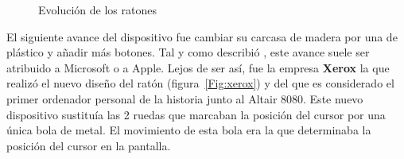 \begin{figure}[t]
     \hfill
{}
     \caption{Evoluci\'on de los ratones}
     \label{fig:primera}
   \end{figure}


El siguiente avance del dispositivo fue cambiar su carcasa de madera por una de pl\'astico y a\~nadir m\'as botones. Tal y como describi\'o \cite{xerox}, este avance suele ser atribuido a Microsoft o a Apple. Lejos de ser as\'i, fue la empresa \textbf{Xerox} la que realiz\'o el nuevo dise\~no del rat\'on (figura~\ref{Fig:xerox}) y del que es considerado el primer ordenador personal de la historia junto al Altair 8080. Este nuevo dispositivo sustitu\'ia las 2 ruedas que marcaban la posici\'on del cursor por una \'unica bola de metal. El movimiento de esta bola era la que determinaba la posici\'on del cursor en la pantalla. \\

